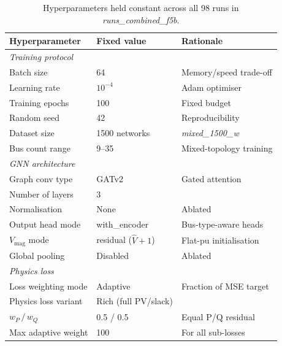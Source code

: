 \begin{table}[htbp]
  \centering
  \caption{Hyperparameters held constant across all 98 runs in
           \textit{runs\_combined\_f5b}.}
  \label{tab:hparam_fixed}
  \renewcommand{\arraystretch}{1.15}
  \begin{tabular}{lll}
    \toprule
    \textbf{Hyperparameter} & \textbf{Fixed value} & \textbf{Rationale} \\
    \midrule
    \multicolumn{3}{l}{\textit{Training protocol}} \\[2pt]
    Batch size              & 64                        & Memory/speed trade-off \\
    Learning rate           & $10^{-4}$                 & Adam optimiser \\
    Training epochs         & 100                       & Fixed budget \\
    Random seed             & 42                        & Reproducibility \\
    Dataset size            & 1500 networks             & \textit{mixed\_1500\_w} \\
    Bus count range         & 9–35                      & Mixed-topology training \\
    \midrule
    \multicolumn{3}{l}{\textit{GNN architecture}} \\[2pt]
    Graph conv type         & GATv2                     & Gated attention \\
    Number of layers        & 3                         & \\
    Normalisation           & None                      & Ablated \\
    Output head mode        & with\_encoder             & Bus-type-aware heads \\
    $V_\text{mag}$ mode     & residual ($\hat{V} + 1$)  & Flat-pu initialisation \\
    Global pooling          & Disabled                  & Ablated \\
    \midrule
    \multicolumn{3}{l}{\textit{Physics loss}} \\[2pt]
    Loss weighting mode     & Adaptive                  & Fraction of MSE target \\
    Physics loss variant    & Rich (full PV/slack)      & \\
    $w_P\,/\,w_Q$           & 0.5 / 0.5                 & Equal P/Q residual \\
    Max adaptive weight     & 100                       & For all sub-losses \\

\end{tabular}
\end{table}
